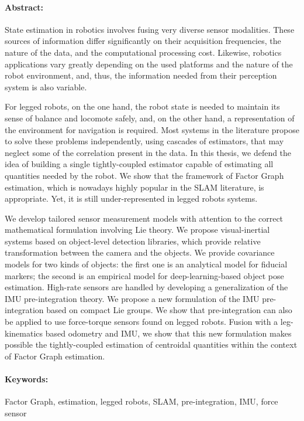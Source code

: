 \newpage

\vspace{5cm}

\paragraph{Abstract:}

State estimation in robotics involves fusing very diverse sensor modalities.
These sources of information differ significantly on their acquisition frequencies, the nature of the data, 
and the computational processing cost. Likewise, robotics applications vary greatly depending on the used
platforms and the nature of the robot environment, and, thus, the information needed from their perception system is also variable.

For legged robots, on the one hand, the robot state is needed to maintain its sense of balance and locomote safely, and,
on the other hand, a representation of the environment for navigation is required. Most systems in the literature propose to solve
these problems independently, using cascades of estimators, that may neglect some of the correlation present in the data. 
In this thesis, we defend the idea of building a single tightly-coupled estimator capable of estimating all quantities needed by the robot. 
We show that the framework of Factor Graph estimation, which is nowadays highly popular in the SLAM literature, is appropriate. 
Yet, it is still under-represented in legged robots systems.

We develop tailored sensor measurement models with attention to the correct mathematical formulation involving Lie theory.
We propose visual-inertial systems based on object-level detection libraries, which provide relative transformation between the camera and the objects.
We provide covariance models for two kinds of objects: the first one is an analytical model for fiducial markers; the second
is an empirical model for deep-learning-based object pose estimation.
High-rate sensors are handled by developing a generalization of the IMU pre-integration theory. We propose a new formulation of the IMU
pre-integration based on compact Lie groups. 
We show that pre-integration can also be applied to use force-torque sensors found on legged robots. 
Fusion with a leg-kinematics based odometry and IMU, we show that this new formulation makes possible the tightly-coupled estimation
of centroidal quantities within the context of Factor Graph estimation.



\paragraph{Keywords:}

Factor Graph, estimation, legged robots, SLAM, pre-integration, IMU, force sensor 
